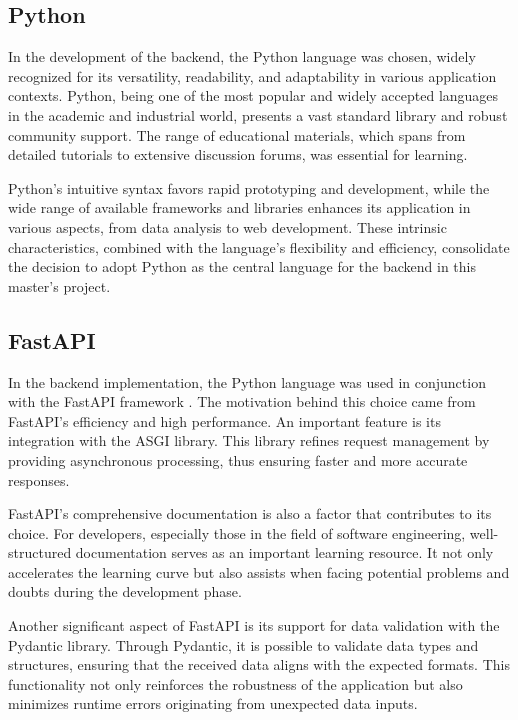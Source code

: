 \subsection{Python}
In the development of the backend, the Python language \cite{pythonOfficialDocs} was chosen, widely recognized for its versatility, readability, and adaptability in various application contexts. Python, being one of the most popular and widely accepted languages in the academic and industrial world, presents a vast standard library and robust community support. The range of educational materials, which spans from detailed tutorials to extensive discussion forums, was essential for learning.

Python's intuitive syntax favors rapid prototyping and development, while the wide range of available frameworks and libraries enhances its application in various aspects, from data analysis to web development. These intrinsic characteristics, combined with the language's flexibility and efficiency, consolidate the decision to adopt Python as the central language for the backend in this master's project.

\subsection{FastAPI}
In the backend implementation, the Python language was used in conjunction with the FastAPI framework \cite{fastapiDocs}. The motivation behind this choice came from FastAPI's efficiency and high performance. An important feature is its integration with the \gls{ASGI} library. This library refines request management by providing asynchronous processing, thus ensuring faster and more accurate responses.

FastAPI's comprehensive documentation is also a factor that contributes to its choice. For developers, especially those in the field of software engineering, well-structured documentation serves as an important learning resource. It not only accelerates the learning curve but also assists when facing potential problems and doubts during the development phase.

Another significant aspect of FastAPI is its support for data validation with the Pydantic library. Through Pydantic, it is possible to validate data types and structures, ensuring that the received data aligns with the expected formats. This functionality not only reinforces the robustness of the application but also minimizes runtime errors originating from unexpected data inputs.

